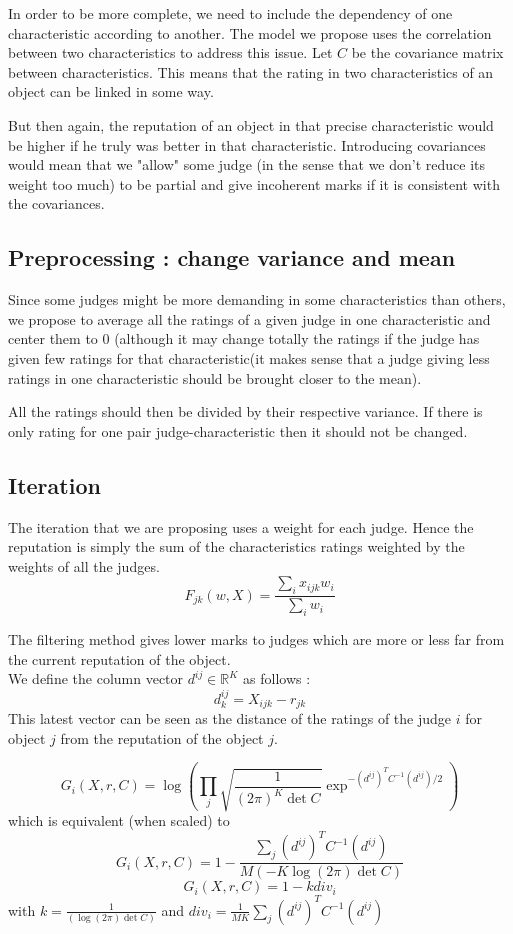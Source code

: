 \documentclass[12pt,a4paper]{article}
\begin{document}
In order to be more complete, we need to include the dependency of one characteristic according to another. The model we propose uses the correlation between two characteristics to address this issue.
Let $C$ be the covariance matrix between characteristics. This means that the rating in two characteristics of an object can be linked in some way.

But then again, the reputation of an object in that precise characteristic would be higher if he truly was better in that characteristic. Introducing covariances would mean that we "allow" some judge (in the sense that we don't reduce its weight too much) to be partial and give incoherent marks if it is consistent with the covariances.

\subsection{Preprocessing : change variance and mean}
Since some judges might be more demanding in some characteristics than others, we propose to average all the ratings of a given judge in one characteristic and center them to $0$ (although it may change totally the ratings if the judge has given few ratings for that characteristic(it makes sense that a judge giving less ratings in one characteristic should be brought closer to the mean).

All the ratings should then be divided by their respective variance. If there is only rating for one pair judge-characteristic then it should not be changed.

\subsection{Iteration}
\label{section:sub:iteration}
The iteration that we are proposing uses a weight for each judge. Hence the reputation is simply the sum of the characteristics ratings weighted by the weights of all the judges.
$$F_{jk}(w,X) = \frac{\sum_{i}x_{ijk}w_{i}}{\sum_i w_{i}}$$


The filtering method gives lower marks to judges which are more or less far from the current reputation of the object.\\
We define the column vector $d^{ij} \in \mathbb{R}^K$ as follows :
$$ d^{ij}_k = X_{ijk}-r_{jk}$$
This latest vector can be seen as the distance of the ratings of the judge $i$ for object $j$ from the reputation of the object $j$.


$$G_{i}(X,r,C) = \log (\prod_j \sqrt{\frac{1}{(2\pi)^{K}\det C}} \exp^{- (d^{ij})^TC^{-1} (d^{ij})/2})$$
which is equivalent (when scaled) to
$$G_{i}(X,r,C) = 1 - \frac{\sum_j (d^{ij})^TC^{-1}(d^{ij})}{M(-K\log(2\pi ) \det C)}$$
$$G_{i}(X,r,C) = 1 -k div_i$$
with $k= \frac{1}{(\log(2\pi ) \det C)}$ and $div_i =  \frac{1}{MK}\sum_{j} (d^{ij})^T C^{-1} (d^{ij})$\\
\end{document}
